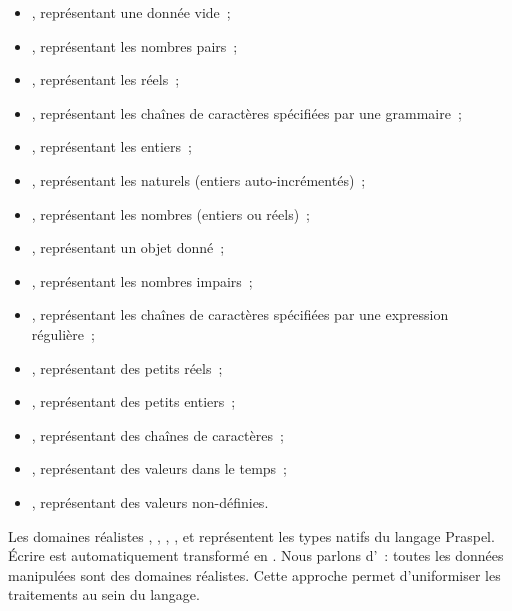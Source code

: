 \begin{itemize}
\item {}, représentant une donnée vide~;

\item {}, représentant les nombres pairs~;

\item {}, représentant les réels~;

\item {}, représentant les chaînes de caractères spécifiées par une
grammaire~;

\item {}, représentant les entiers~;

\item {}, représentant les naturels (entiers auto-incrémentés)~;

\item {}, représentant les nombres (entiers ou réels)~;

\item {}, représentant un objet donné~;

\item {}, représentant les nombres impairs~;

\item {}, représentant les chaînes de caractères spécifiées par une
expression régulière~;

\item {}, représentant des petits réels~;

\item {}, représentant des petits entiers~;

\item {}, représentant des chaînes de caractères~;

\item {}, représentant des valeurs dans le temps~;

\item {}, représentant des valeurs non-définies.

\end{itemize}
%
Les domaines réalistes , ,
, ,  et
 représentent les types natifs du langage Praspel. Écrire
 est automatiquement transformé en . Nous
parlons d'~: toutes les données manipulées sont des
domaines réalistes. Cette approche permet d'uniformiser les traitements au sein
du langage.

